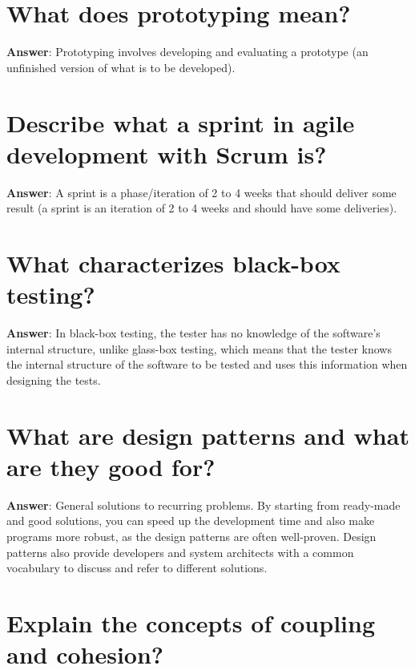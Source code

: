 \documentclass[a4paper,11pt,oneside]{book}
\begin{document}
\begin{sloppypar}
\section{What does prototyping mean?}

\label{q:235:sa:en:True}

\textbf{Answer}: Prototyping involves developing and evaluating a prototype (an unfinished version of what is to be developed).



\section{Describe what a sprint in agile development with Scrum is?}

\label{q:236:sa:en:True}

\textbf{Answer}: A sprint is a phase/iteration of 2 to 4 weeks that should deliver some result (a sprint is an iteration of 2 to 4 weeks and should have some deliveries).



\section{What characterizes black-box testing?}

\label{q:237:sa:en:True}

\textbf{Answer}: In black-box testing, the tester has no knowledge of the software's internal structure, unlike glass-box testing, which means that the tester knows the internal structure of the software to be tested and uses this information when designing the tests.



\section{What are design patterns and what are they good for?}

\label{q:238:sa:en:True}

\textbf{Answer}: General solutions to recurring problems. By starting from ready-made and good solutions, you can speed up the development time and also make programs more robust, as the design patterns are often well-proven. Design patterns also provide developers and system architects with a common vocabulary to discuss and refer to different solutions.



\section{Explain the concepts of coupling and cohesion?}


\end{sloppypar}
\end{document}
